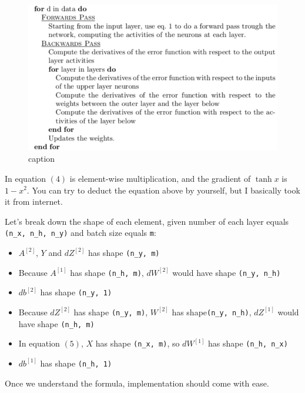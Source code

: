 \documentclass[11pt]{article}
\begin{document}
    \begin{figure}
\centering
\includegraphics{./pic/chapter-5-1_pic_4.png}
\caption{caption}
\end{figure}

    In equation \((4)\) is element-wise multiplication, and the gradient of
\(\tanh{x}\) is \(1 - x^2\). You can try to deduct the equation above by
yourself, but I basically took it from internet.

Let's break down the shape of each element, given number of each layer
equals \texttt{(n\_x,\ n\_h,\ n\_y)} and batch size equals \texttt{m}:

\begin{itemize}
\item
  \(A^{[2]}\), \(Y\) and \(dZ^{[2]}\) has shape \texttt{(n\_y,\ m)}
\item
  Because \(A^{[1]}\) has shape \texttt{(n\_h,\ m)}, \(dW^{[2]}\) would
  have shape \texttt{(n\_y,\ n\_h)}
\item
  \(db^{[2]}\) has shape \texttt{(n\_y,\ 1)}
\item
  Because \(dZ^{[2]}\) has shape \texttt{(n\_y,\ m)}, \(W^{[2]}\) has
  shape\texttt{(n\_y,\ n\_h)}, \(dZ^{[1]}\) would have shape
  \texttt{(n\_h,\ m)}
\item
  In equation \((5)\), \(X\) has shape \texttt{(n\_x,\ m)}, so
  \(dW^{[1]}\) has shape \texttt{(n\_h,\ n\_x)}
\item
  \(db^{[1]}\) has shape \texttt{(n\_h,\ 1)}
\end{itemize}

Once we understand the formula, implementation should come with ease.
\end{document}
